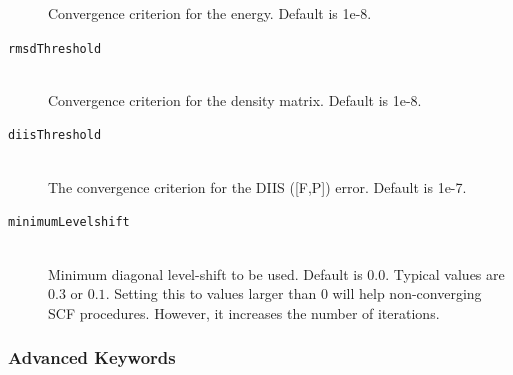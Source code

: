 \documentclass[bibliography=totocnumbered,a4paper,10pt,oneside]{scrbook}
\begin{document}
\begin{description}
   Convergence criterion for the energy. Default is 1e-8.
   \item [\texttt{rmsdThreshold}]\hfill \\
   Convergence criterion for the density matrix. Default is 1e-8.
  \item [\texttt{diisThreshold}]\hfill \\
   The convergence criterion for the DIIS ([F,P]) error. Default is 1e-7.
   \item [\texttt{minimumLevelshift}]\hfill \\
   Minimum diagonal level-shift to be used. Default is $0.0$. Typical values are $0.3$ or $0.1$. Setting this to values larger than $0$ will
   help non-converging SCF procedures. However, it increases the number of iterations.
\end{description}
\subsubsection{Advanced Keywords}
\end{document}
